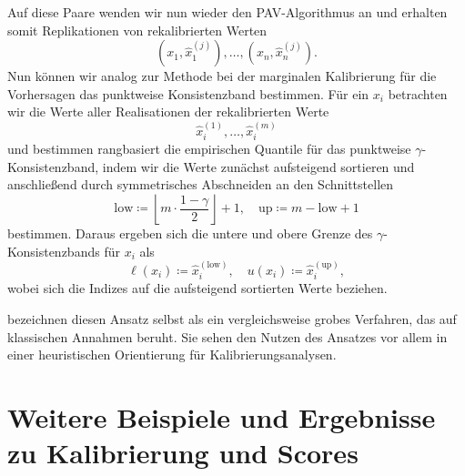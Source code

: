 Auf diese Paare wenden wir nun wieder den PAV-Algorithmus an und erhalten somit Replikationen von rekalibrierten Werten
\[
(x_1,\hat x_1^{(j)}),\dotsc,(x_n,\hat x_n^{(j)}).
\]
Nun können wir analog zur Methode bei der marginalen Kalibrierung für die Vorhersagen das punktweise Konsistenzband bestimmen. Für ein $x_i$ betrachten wir die Werte aller Realisationen der rekalibrierten Werte
\[
\hat x_i^{(1)}, \dotsc, \hat x_i^{(m)}
\]
und bestimmen rangbasiert die empirischen Quantile für das punktweise $\gamma$-Konsistenzband, indem wir 
die Werte zunächst aufsteigend sortieren und anschließend durch symmetrisches Abschneiden an den Schnittstellen 
\[
\mathrm{low} \coloneqq \left\lfloor m \cdot \frac{1-\gamma}{2} \right\rfloor+1, 
\quad
\mathrm{up} \coloneqq m - \mathrm{low}+1
\]
bestimmen. Daraus ergeben sich die untere und obere Grenze des $\gamma$-Konsistenzbands für $x_i$ als
\[
\ell(x_i) \coloneqq \hat x_i^{(\mathrm{low})}, \quad
u(x_i) \coloneqq \hat x_i^{(\mathrm{up})},
\]
wobei sich die Indizes auf die aufsteigend sortierten Werte beziehen. 

\textcite{gneiting2023regression} bezeichnen diesen Ansatz selbst als ein vergleichsweise grobes Verfahren, das auf klassischen Annahmen beruht. Sie sehen den Nutzen des Ansatzes vor allem in einer heuristischen Orientierung für Kalibrierungsanalysen.







\chapter{Weitere Beispiele und Ergebnisse zu Kalibrierung und Scores} \label{chap:other_examp}

